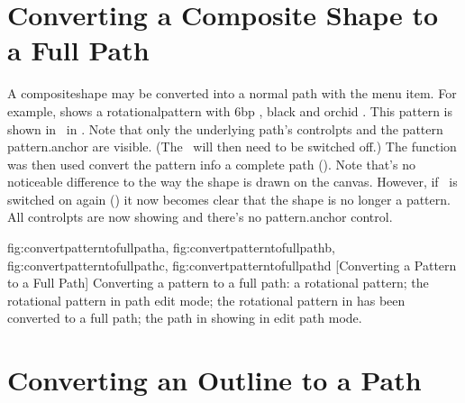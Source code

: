
\section{Converting a Composite Shape to a Full Path}\label{sec:converttofullpath}


A \gls{compositeshape} may be converted into a normal path with the
 menu item.  For example,
 shows a
\gls{rotationalpattern} with 6\gls{bp} , black
 and orchid .  This
pattern is shown in \editpathmode\ in
. Note that only the
underlying path's \glspl{controlpt} and the pattern
\gls{pattern.anchor} are visible. (The \editpathmode\ will then need
to be switched off.) The  function was
then used convert the \gls{pattern} info a complete \gls{path}
().  Note that's no
noticeable difference to the way the \gls{shape} is drawn on the
\gls{canvas}. However, if \editpathmode\ is switched on again
() it now becomes clear
that the shape is no longer a \gls{pattern}. All \glspl{controlpt}
are now showing and there's no \gls{pattern.anchor} control.

{
  {fig:convertpatterntofullpatha}{}{},
  {fig:convertpatterntofullpathb}{}{},
  {fig:convertpatterntofullpathc}{}{},
  {fig:convertpatterntofullpathd}{}{}
}
[Converting a Pattern to a Full Path]
{Converting a pattern to a full path:
 a rotational pattern;
 the rotational pattern in
path edit mode; 
 the rotational pattern
in  has been converted to a
full path;
 the path
in  showing in edit 
path mode.}

\section{Converting an Outline to a Path}\label{sec:outlinetopath}

